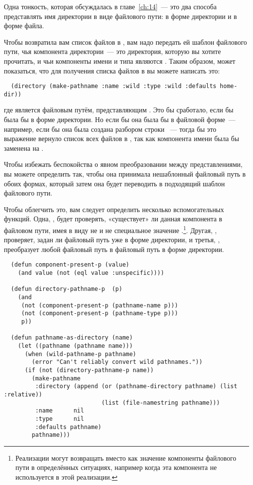 Одна тонкость, которая обсуждалась в главе~\ref{ch:14}~--- это два способа представлять
имя директории в виде файлового пути: в форме директории и в форме файла.

Чтобы  возвратила вам список файлов в , вам надо
передать ей шаблон файлового пути, чья компонента директории~--- это директория, которую
вы хотите прочитать, и чьи компоненты имени и типа являются . Таким образом,
может показаться, что для получения списка файлов в  вы можете написать
это:

\begin{lstlisting}
  (directory (make-pathname :name :wild :type :wild :defaults home-dir))
\end{lstlisting}

где  является файловым путём, представляющим . Это бы
сработало, если бы  была бы в форме директории. Но если бы она была бы в
файловой форме~--- например, если бы она была создана разбором строки
~--- тогда бы это выражение вернуло список всех файлов в
, так как компонента имени  была бы заменена на
.

Чтобы избежать беспокойства о явном преобразовании между представлениями, вы можете
определить  так, чтобы она принимала нешаблонный файловый путь в
обоих формах, который затем она будет переводить в подходящий шаблон файлового пути.

Чтобы облегчить это, вам следует определить несколько вспомогательных функций. Одна,
, будет проверять, «существует» ли данная компонента в файловом
пути, имея в виду не  и не специальное значение
.\footnote{Реализации могут возвращать  вместо
   как значение компоненты файлового пути в определённых ситуациях, например
  когда эта компонента не используется в этой реализации.}. Другая,
, проверяет, задан ли файловый путь уже в форме директории, и
третья, , преобразует любой файловый путь в файловый путь в
форме директории.

\begin{lstlisting}
  (defun component-present-p (value)
    (and value (not (eql value :unspecific))))

  (defun directory-pathname-p  (p)
    (and
     (not (component-present-p (pathname-name p)))
     (not (component-present-p (pathname-type p)))
     p))

  (defun pathname-as-directory (name)
    (let ((pathname (pathname name)))
      (when (wild-pathname-p pathname)
        (error "Can't reliably convert wild pathnames."))
      (if (not (directory-pathname-p name))
        (make-pathname
         :directory (append (or (pathname-directory pathname) (list :relative))
                            (list (file-namestring pathname)))
         :name      nil
         :type      nil
         :defaults pathname)
        pathname)))
\end{lstlisting}

